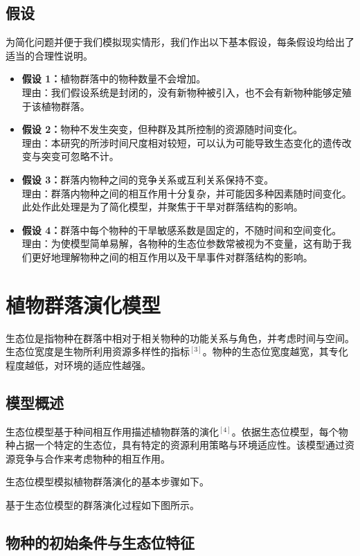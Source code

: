 \documentclass[11pt,a4paper]{ctexart}
\begin{document}
\subsection{假设}

为简化问题并便于我们模拟现实情形，我们作出以下基本假设，每条假设均给出了适当的合理性说明。

\begin{itemize}
\item \textbf{假设 1：}植物群落中的物种数量不会增加。\\
理由：我们假设系统是封闭的，没有新物种被引入，也不会有新物种能够定殖于该植物群落。
\item \textbf{假设 2：}物种不发生突变，但种群及其所控制的资源随时间变化。\\
理由：本研究的所涉时间尺度相对较短，可以认为可能导致生态变化的遗传改变与突变可忽略不计。
\item \textbf{假设 3：}群落内物种之间的竞争关系或互利关系保持不变。\\
理由：群落内物种之间的相互作用十分复杂，并可能因多种因素随时间变化。此处作此处理是为了简化模型，并聚焦于干旱对群落结构的影响。
\item \textbf{假设 4：}群落中每个物种的干旱敏感系数是固定的，不随时间和空间变化。\\
理由：为使模型简单易解，各物种的生态位参数常被视为不变量，这有助于我们更好地理解物种之间的相互作用以及干旱事件对群落结构的影响。
\end{itemize}

\section{植物群落演化模型}

生态位是指物种在群落中相对于相关物种的功能关系与角色，并考虑时间与空间。生态位宽度是生物所利用资源多样性的指标$^{[3]}$。物种的生态位宽度越宽，其专化程度越低，对环境的适应性越强。

\subsection{模型概述}

生态位模型基于种间相互作用描述植物群落的演化$^{[4]}$。依据生态位模型，每个物种占据一个特定的生态位，具有特定的资源利用策略与环境适应性。该模型通过资源竞争与合作来考虑物种的相互作用。

生态位模型模拟植物群落演化的基本步骤如下。

基于生态位模型的群落演化过程如下图所示。

\subsection{物种的初始条件与生态位特征}
\end{document}
